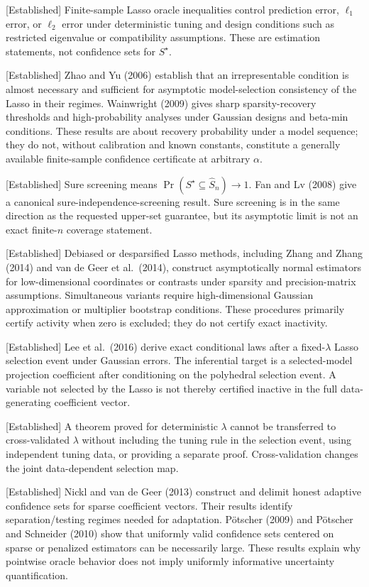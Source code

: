 \documentclass[
  english,
  11pt,
  a4paper,
]{article}
\begin{document}
{[}Established{]} Finite-sample Lasso oracle inequalities control
prediction error, $\ell_1$ error, or $\ell_2$ error under
deterministic tuning and design conditions such as restricted eigenvalue
or compatibility assumptions. These are estimation statements, not
confidence sets for $S^\star$.

{[}Established{]} Zhao and Yu (2006) establish that an irrepresentable
condition is almost necessary and sufficient for asymptotic
model-selection consistency of the Lasso in their regimes. Wainwright
(2009) gives sharp sparsity-recovery thresholds and high-probability
analyses under Gaussian designs and beta-min conditions. These results
are about recovery probability under a model sequence; they do not,
without calibration and known constants, constitute a generally
available finite-sample confidence certificate at arbitrary $\alpha$.

{[}Established{]} Sure screening means
$\Pr(S^\star\subseteq\widehat S_n)\to1$. Fan and Lv (2008) give a
canonical sure-independence-screening result. Sure screening is in the
same direction as the requested upper-set guarantee, but its asymptotic
limit is not an exact finite-$n$ coverage statement.

{[}Established{]} Debiased or desparsified Lasso methods, including
Zhang and Zhang (2014) and van de Geer et al.~(2014), construct
asymptotically normal estimators for low-dimensional coordinates or
contrasts under sparsity and precision-matrix assumptions. Simultaneous
variants require high-dimensional Gaussian approximation or multiplier
bootstrap conditions. These procedures primarily certify activity when
zero is excluded; they do not certify exact inactivity.

{[}Established{]} Lee et al.~(2016) derive exact conditional laws after
a fixed-$\lambda$ Lasso selection event under Gaussian errors. The
inferential target is a selected-model projection coefficient after
conditioning on the polyhedral selection event. A variable not selected
by the Lasso is not thereby certified inactive in the full
data-generating coefficient vector.

{[}Established{]} A theorem proved for deterministic $\lambda$ cannot
be transferred to cross-validated $\lambda$ without including the
tuning rule in the selection event, using independent tuning data, or
providing a separate proof. Cross-validation changes the joint
data-dependent selection map.

{[}Established{]} Nickl and van de Geer (2013) construct and delimit
honest adaptive confidence sets for sparse coefficient vectors. Their
results identify separation/testing regimes needed for adaptation.
Pötscher (2009) and Pötscher and Schneider (2010) show that uniformly
valid confidence sets centered on sparse or penalized estimators can be
necessarily large. These results explain why pointwise oracle behavior
does not imply uniformly informative uncertainty quantification.
\end{document}
